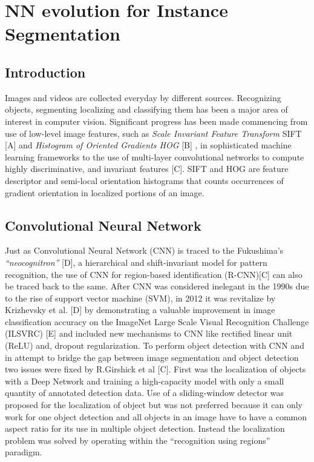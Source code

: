 \section{NN evolution for Instance Segmentation}\label{s:nnevo}

\subsection{Introduction}\label{s:nnevo-intro}

Images and videos are collected everyday by different sources. Recognizing objects, segmenting localizing and classifying them has been a major area of interest in computer vision. Significant progress has been made commencing from use of low-level image features, such as \emph {Scale Invariant Feature Transform}  SIFT [A] and \emph{ Histogram of Oriented Gradients HOG }[B] , in sophisticated machine learning frameworks to the use of multi-layer convolutional networks to compute highly discriminative, and invariant features [C]. SIFT and HOG are feature descriptor and semi-local orientation histograms that counts occurrences of gradient orientation in localized portions of an image. 

\subsection{Convolutional Neural Network}\label{s:nnevo-cnn}

Just as Convolutional Neural Network (CNN) is traced to the Fukushima’s \emph{ “neocognitron”} [D], a hierarchical and shift-invariant model for pattern recognition, the use of CNN for region-based identification (R-CNN)[C] can also be traced back to the same.  After CNN was considered inelegant in the 1990s due to the rise of support vector machine (SVM), in 2012 it was revitalize by Krizhevsky et al. [D] by demonstrating a valuable improvement in image classification accuracy on the ImageNet Large Scale Visual Recognition Challenge (ILSVRC) [E] and included new mechanisms to CNN like rectified linear unit (ReLU) and, dropout regularization. To perform object detection with CNN and in attempt to bridge the gap between image segmentation and object detection two issues were fixed by R.Girshick et al [C]. First was the localization of objects with a Deep Network and training a high-capacity model with only a small quantity of annotated detection data. Use of a sliding-window detector was proposed for the localization of object but was not preferred because it can only work for one object detection and all objects in an image have to have a common aspect ratio for its use in multiple object detection. Instead the localization problem was solved by operating within the “recognition using regions” paradigm.

